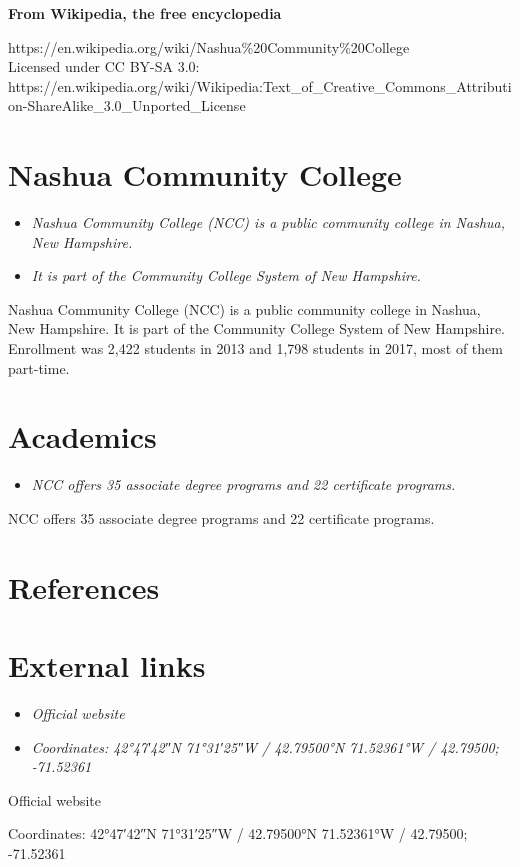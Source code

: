 \textbf{From Wikipedia, the free encyclopedia}

https://en.wikipedia.org/wiki/Nashua\%20Community\%20College\\
Licensed under CC BY-SA 3.0:\\
https://en.wikipedia.org/wiki/Wikipedia:Text\_of\_Creative\_Commons\_Attribution-ShareAlike\_3.0\_Unported\_License

\section{Nashua Community College}\label{nashua-community-college}

\begin{itemize}
\item
  \emph{Nashua Community College (NCC) is a public community college in
  Nashua, New Hampshire.}
\item
  \emph{It is part of the Community College System of New Hampshire.}
\end{itemize}

Nashua Community College (NCC) is a public community college in Nashua,
New Hampshire. It is part of the Community College System of New
Hampshire. Enrollment was 2,422 students in 2013 and 1,798 students in
2017, most of them part-time.

\section{Academics}\label{academics}

\begin{itemize}
\item
  \emph{NCC offers 35 associate degree programs and 22 certificate
  programs.}
\end{itemize}

NCC offers 35 associate degree programs and 22 certificate programs.

\section{References}\label{references}

\section{External links}\label{external-links}

\begin{itemize}
\item
  \emph{Official website}
\item
  \emph{Coordinates: 42°47′42″N 71°31′25″W﻿ / ﻿42.79500°N 71.52361°W﻿ /
  42.79500; -71.52361}
\end{itemize}

Official website

Coordinates: 42°47′42″N 71°31′25″W﻿ / ﻿42.79500°N 71.52361°W﻿ /
42.79500; -71.52361
